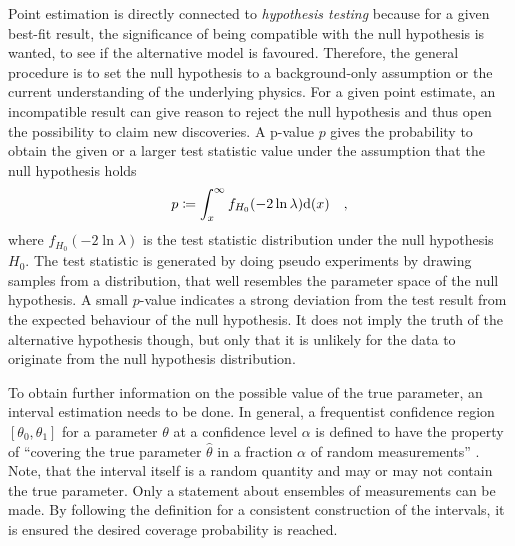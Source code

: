 Point estimation is directly connected to \emph{hypothesis testing} because for a given best-fit result, the significance of being compatible with the null hypothesis is wanted, to see if the alternative model is favoured.
Therefore, the general procedure is to set the null hypothesis to a background-only assumption or the current understanding of the underlying physics.
For a given point estimate, an incompatible result can give reason to reject the null hypothesis and thus open the possibility to claim new discoveries.
A p-value $p$ gives the probability to obtain the given or a larger test statistic value under the assumption that the null hypothesis holds
\begin{equation}
  p \coloneqq \int_x^\infty f_{H_0}(-2\ln\lambda) \mathrm{d}(x)
  \quad\text{,}
\end{equation}
where $f_{H_0}(-2\ln\lambda)$ is the test statistic distribution under the null hypothesis $H_0$.
The test statistic is generated by doing pseudo experiments by drawing samples from a distribution, that well resembles the parameter space of the null hypothesis.
A small $p$-value indicates a strong deviation from the test result from the expected behaviour of the null hypothesis.
It does not imply the truth of the alternative hypothesis though, but only that it is unlikely for the data to originate from the null hypothesis distribution.

To obtain further information on the possible value of the true parameter, an interval estimation needs to be done.
In general, a frequentist confidence region $[\theta_0, \theta_1]$ for a parameter $\theta$ at a confidence level $\alpha$ is defined to have the property of \enquote{covering the true parameter $\hat{\theta}$ in a fraction $\alpha$ of random measurements} \cite{casella2002statistical}.
Note, that the interval itself is a random quantity and may or may not contain the true parameter.
Only a statement about ensembles of measurements can be made.
By following the definition for a consistent construction of the intervals, it is ensured the desired coverage probability is reached.

